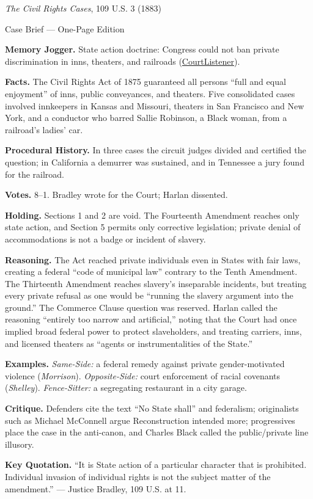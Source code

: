 \documentclass[12pt]{article}
\begin{document}
\begin{center}
{\Large \textit{The Civil Rights Cases}, 109 U.S. 3 (1883)\par}
\vspace{0.3em}
{\normalsize Case Brief --- One-Page Edition\par}
\end{center}

\textbf{Memory Jogger.} State action doctrine: Congress could not ban private discrimination in inns, theaters, and railroads (\href{https://www.courtlistener.com/opinion/90897/civil-rights-cases/}{CourtListener}).

\textbf{Facts.} The Civil Rights Act of 1875 guaranteed all persons ``full and equal enjoyment'' of inns, public conveyances, and theaters. Five consolidated cases involved innkeepers in Kansas and Missouri, theaters in San Francisco and New York, and a conductor who barred Sallie Robinson, a Black woman, from a railroad's ladies' car.

\textbf{Procedural History.} In three cases the circuit judges divided and certified the question; in California a demurrer was sustained, and in Tennessee a jury found for the railroad.

\textbf{Votes.} 8--1. Bradley wrote for the Court; Harlan dissented.

\textbf{Holding.} Sections 1 and 2 are void. The Fourteenth Amendment reaches only state action, and Section 5 permits only corrective legislation; private denial of accommodations is not a badge or incident of slavery.

\textbf{Reasoning.} The Act reached private individuals even in States with fair laws, creating a federal ``code of municipal law'' contrary to the Tenth Amendment. The Thirteenth Amendment reaches slavery's inseparable incidents, but treating every private refusal as one would be ``running the slavery argument into the ground.'' The Commerce Clause question was reserved. Harlan called the reasoning ``entirely too narrow and artificial,'' noting that the Court had once implied broad federal power to protect slaveholders, and treating carriers, inns, and licensed theaters as ``agents or instrumentalities of the State.''

\textbf{Examples.} \emph{Same-Side:} a federal remedy against private gender-motivated violence (\textit{Morrison}). \emph{Opposite-Side:} court enforcement of racial covenants (\textit{Shelley}). \emph{Fence-Sitter:} a segregating restaurant in a city garage.

\textbf{Critique.} Defenders cite the text ``No State shall'' and federalism; originalists such as Michael McConnell argue Reconstruction intended more; progressives place the case in the anti-canon, and Charles Black called the public/private line illusory.

\textbf{Key Quotation.} ``It is State action of a particular character that is prohibited. Individual invasion of individual rights is not the subject matter of the amendment.'' --- Justice Bradley, 109 U.S. at 11.
\end{document}
